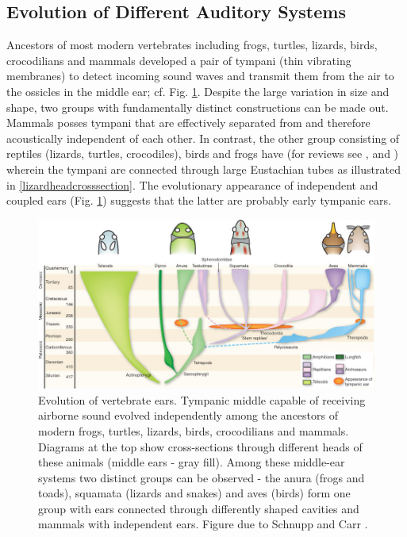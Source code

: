 \subsection{Evolution of Different Auditory Systems}\label{auditoryevolution}
Ancestors of most modern vertebrates including frogs, turtles, lizards, birds, crocodilians and mammals
developed a pair of tympani (thin vibrating membranes) to detect incoming sound waves and transmit
them from the air to the ossicles in the middle ear; cf. Fig. \ref{vertebrateearevolution}. 
Despite the large variation in size and shape, two groups with fundamentally distinct constructions can be
made out. Mammals posses tympani that are effectively separated from and therefore acoustically 
independent of each other. In contrast, the other group consisting of reptiles (lizards, turtles, crocodiles), birds and frogs
have  (for reviews see \cite{carrsoares}, \cite{dalsgaardcarr} and \cite{schnuppcarr}) wherein
the tympani are connected through large Eustachian tubes as illustrated in \ref{lizardheadcrosssection}. The evolutionary 
appearance of independent and coupled ears (Fig. \ref{vertebrateearevolution}) suggests that the latter are probably early
tympanic ears.
\begin{figure}[ht!]
 \includegraphics[width=1.0\linewidth]{Diagrams/vertebrateearevolution.jpg}
 \caption[Vertebrate Ear Evolution]{Evolution of vertebrate ears. Tympanic
 middle capable of receiving airborne sound evolved independently among the ancestors of modern frogs, turtles, lizards, birds,
 crocodilians and mammals. Diagrams at the top show cross-sections through different heads of these animals (middle ears - gray fill).
 Among these middle-ear systems two distinct groups can be observed - the anura (frogs and toads), squamata (lizards and snakes)
 and aves (birds) form one group with ears connected through differently shaped cavities and mammals with independent ears. Figure due to Schnupp and Carr \cite{schnuppcarr}.}
 \label{vertebrateearevolution}
\end{figure}

